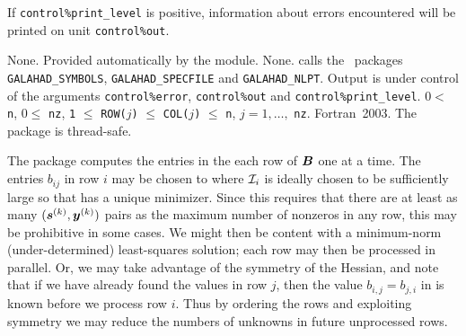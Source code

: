 \documentclass{galahad}
\newcommand{\packagename}{SHA}
\begin{document}

\galinfo
If {\tt control\%print\_level} is positive, information about
errors encountered will be printed on unit {\tt control\-\%out}.


\galgeneral

\galcommon None.
\galworkspace Provided automatically by the module.
\galroutines None.
\galmodules {\tt \packagename\_solve} calls the \galahad\ packages
{\tt GALAHAD\_SY\-M\-BOLS},
{\tt GALAHAD\_SPECFILE} and
{\tt GALAHAD\_NLPT}.
\galio Output is under control of the arguments
 {\tt control\%error}, {\tt control\%out} and {\tt control\%print\_level}.
\galrestrictions
$0 <$ {\tt n},  $0 \le$ {\tt nz},
{\tt 1} $\le$ {\tt ROW(}$j${\tt )} $\le$ {\tt COL(}$j${\tt )} $\le$ {\tt n},
$j = 1, \ldots,$ {\tt nz}.
\galportability Fortran~2003.
The package is thread-safe.


\galmethod
The package computes the entries in the each row of ${\bm{B}}$ one at a time.
The entries $b_{ij}$ in row $i$ may be chosen to
where ${\cal I}_i$ is ideally chosen to be sufficiently large so that 
has a unique minimizer. Since this requires that there are at least
as many $({\bm{s}}^{(k)}, {\bm{y}}^{(k)})$ pairs as the maximum number of nonzeros
in any row, this may be prohibitive in some cases. We might then be content
with a minimum-norm (under-determined) least-squares solution; each row
may then be processed in parallel. Or, we may
take advantage of the symmetry of the Hessian, and note that if we
have already found the values in row $j$, then the value $b_{i,j} = b_{j,i}$
in  is known before we process row $i$. Thus by ordering the rows
and exploiting symmetry we may reduce the numbers of unknowns in
future unprocessed rows.
\end{document}
